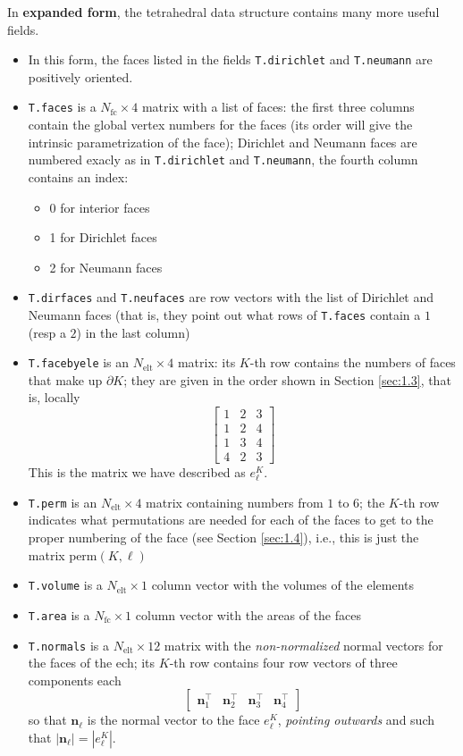 \documentclass[10pt,english]{article}
\newcommand{\Nelt}{{N_{\mathrm{elt}}}}
\newcommand{\Nfc}{{N_{\mathrm{fc}}}}
\begin{document}
In {\bf expanded form}, the tetrahedral data structure contains many more useful fields.
\begin{itemize}
\item In this form, the faces listed in the fields {\tt T.dirichlet} and {\tt T.neumann} are positively oriented.
\item {\tt T.faces} is a $\Nfc\times 4$ matrix with a list of faces: the first three columns contain the global vertex numbers for the faces (its order will give the intrinsic parametrization of the face); Dirichlet and Neumann faces are numbered exacly as in {\tt T.dirichlet} and {\tt T.neumann}, the fourth column contains an index:
\begin{itemize}
\item 0 for interior faces
\item 1 for Dirichlet faces
\item 2 for Neumann faces
\end{itemize}
\item {\tt T.dirfaces} and {\tt T.neufaces} are row vectors with the list of Dirichlet and Neumann faces (that is, they point out what rows of {\tt T.faces} contain a $1$ (resp a $2$) in the last column)
\item {\tt T.facebyele} is an $\Nelt\times 4$ matrix: its $K$-th row contains the numbers of faces that make up $\partial K$; they are given in the order shown in Section \ref{sec:1.3}, that is, locally
\[
 \left[\begin{array}{ccc} 1 & 2 & 3 \\ 1 & 2 & 4 \\1 & 3 & 4 \\4 & 2 & 3\end{array}\right]
\]
This is the matrix we have described as $e_\ell^K$.
\item {\tt T.perm} is an $\Nelt\times 4$ matrix containing numbers from $1$ to $6$; the $K$-th row indicates what permutations are needed for each of the faces to get to the proper numbering of the face (see Section \ref{sec:1.4}), i.e., this is just the matrix $\mathrm{perm}(K,\ell)$
\item {\tt T.volume} is a $\Nelt\times 1$ column vector with the volumes of the elements
\item {\tt T.area} is a $\Nfc\times 1$ column vector with the areas of the faces
\item {\tt T.normals} is a $\Nelt\times 12$ matrix with the {\em non-normalized} normal vectors for the faces of the ech; its $K$-th row contains four row vectors of three components each
\[
\left[ \begin{array}{c|c|c|c} \mathbf n_1^\top & \mathbf n_2^\top & \mathbf n_3^\top & \mathbf n_4^\top\end{array}\right]
\]
so that $\mathbf n_\ell$ is the normal vector to the face $e_\ell^K$, {\em pointing outwards} and such that $|\mathbf n_\ell|=|e_\ell^K|$.
\end{itemize}
\end{document}
